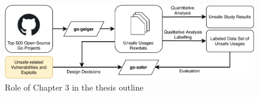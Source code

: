 \begin{figure}[htp!]
    \includegraphics[width=\textwidth]{assets/figures/chapter3/outline3.pdf}
    \caption{Role of Chapter 3 in the thesis outline}
    \label{fig:outline3}
\end{figure}
